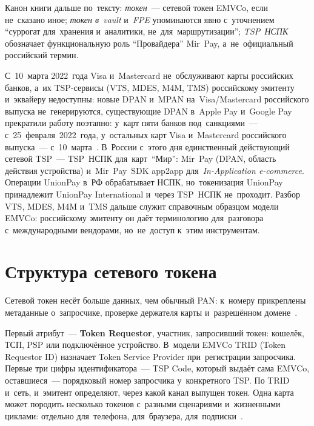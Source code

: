 Канон книги дальше по~тексту: \emph{токен}~--- сетевой токен EMVCo, если
не~сказано иное; \emph{токен в~vault} и~\emph{FPE} упоминаются явно с~уточнением
\enquote{суррогат для~хранения и~аналитики, не~для~маршрутизации};
\emph{TSP~НСПК} обозначает функциональную роль \enquote{Провайдера} Mir~Pay,
а~не~официальный российский термин.

С~10~марта 2022~года Visa и~Mastercard не~обслуживают карты российских банков,
а~их TSP-сервисы (VTS, MDES, M4M, TMS) российскому эмитенту и~эквайеру
недоступны: новые DPAN и~MPAN на~Visa/Mastercard российского выпуска
не~генерируются, существующие DPAN в~Apple Pay и~Google Pay прекратили работу
поэтапно: у~карт пяти банков под~санкциями~--- с~25~февраля~2022~года,
у~остальных карт Visa и~Mastercard российского выпуска~--- с~10~марта~\cite{cbr-cards-sanctions-2022,vedomosti-applepay-sanctions-2022,cbr-cards-work-2022}.
В~России с~этого дня единственный действующий сетевой
TSP~--- TSP~НСПК для~карт~\enquote{Мир}: Mir~Pay (DPAN, область действия
устройства) и~Mir~Pay~SDK app2app для~\textit{In-Application e-commerce}.
Операции UnionPay в~РФ обрабатывает НСПК, но~токенизация UnionPay принадлежит
UnionPay International и~через TSP~НСПК не~проходит. Разбор VTS, MDES, M4M
и~TMS дальше служит справочным образцом модели EMVCo: российскому эмитенту он
даёт терминологию для~разговора с~международными вендорами, но~не~доступ к~этим
инструментам.

\section{Структура сетевого токена}\label{sec:token-anatomy}

Сетевой токен несёт больше данных, чем обычный PAN: к~номеру прикреплены
метаданные о~запросчике, проверке держателя карты и~разрешённом
домене~\cite{emvco-payment-tokenisation-guide}.

Первый атрибут~--- \textbf{Token Requestor}, участник, запросивший токен:
кошелёк, ТСП, PSP или подключённое устройство. В~модели EMVCo TRID (Token
Requestor ID) назначает Token Service Provider при~регистрации запросчика.
Первые три цифры идентификатора~--- TSP Code, который выдаёт сама EMVCo,
оставшиеся~--- порядковый номер запросчика у~конкретного TSP. По TRID и~сеть,
и~эмитент определяют, через какой канал выпущен токен. Одна карта может
породить несколько токенов с~разными сценариями и~жизненными циклами: отдельно
для~телефона, для~браузера,
для~подписки~\cite{emvco-payment-tokenisation-guide}.

